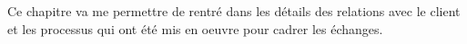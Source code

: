 Ce chapitre va me permettre de rentré dans les détails des relations avec le client et les processus qui ont été mis en oeuvre pour cadrer les échanges.